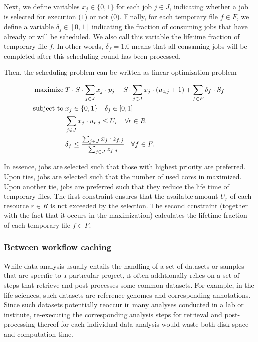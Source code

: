 \documentclass[parskip=half]{scrartcl}
\begin{document}
Next, we define variables $x_j \in \{0,1\}$ for each job $j \in J$, indicating whether a job is selected for execution ($1$) or not ($0$).
Finally, for each temporary file $f \in F$, we define a variable $\delta_f \in [0,1]$ indicating the fraction of consuming jobs that have already or will be scheduled.
We also call this variable the lifetime fraction of temporary file $f$.
In other words, $\delta_f = 1.0$ means that all consuming jobs will be completed after this scheduling round has been processed.

Then, the scheduling problem can be written as linear optimization problem 

\begin{align*}
	\text{maximize } & T \cdot S \cdot \sum_{j \in J} x_j \cdot p_j + S \cdot \sum_{j \in J} x_j \cdot (u_{\text{c},j} + 1) + \sum_{f \in F} \delta_f \cdot S_f \\ \text{subject to } & x_j \in \{0,1\} \quad \delta_j \in [0,1]\\ \quad & \sum_{j \in J} x_j \cdot u_{r,j} \leq U_r \quad \forall r \in R\\ \quad & \delta_f \leq \frac{\sum_{j \in J} x_j \cdot z_{f,j}}{\sum_{j \in J} z_{f,j}} \quad\forall f \in F.
\end{align*}

In essence, jobs are selected such that those with highest priority are preferred.
Upon ties, jobs are selected such that the number of used cores in maximized.
Upon another tie, jobs are preferred such that they reduce the life time of temporary files.
The first constraint ensures that the available amount $U_r$ of each resource $r \in R$ is not exceeded by the selection.
The second constraint (together with the fact that it occurs in the maximization) calculates the lifetime fraction of each temporary file $f \in F$.

\subsubsection{Between workflow caching}

While data analysis usually entails the handling of a set of datasets or samples that are specific to a particular project, it often additionally relies on a set of steps that retrieve and post-processes some common datasets.
For example, in the life sciences, such datasets are reference genomes and corresponding annotations.
Since such datasets potentially reoccur in many analyses conducted in a lab or institute, re-executing the corresponding analysis steps for retrieval and post-processing thereof for each individual data analysis would waste both disk space and computation time.
\end{document}
